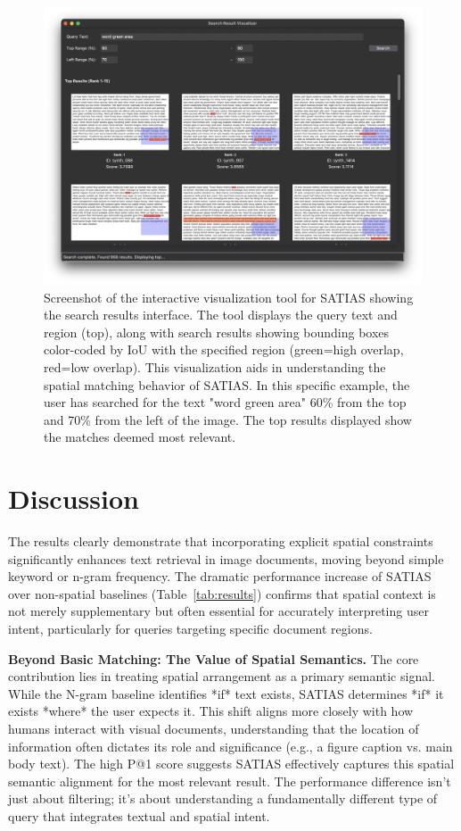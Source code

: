 \documentclass[manuscript,screen]{acmart}
\begin{document}
\begin{figure}
    \centering
    \includegraphics[width=\linewidth]{visualization_tool.png}
    \caption{Screenshot of the interactive visualization tool for SATIAS showing the search results interface. The tool displays the query text and region (top), along with search results showing bounding boxes color-coded by IoU with the specified region (green=high overlap, red=low overlap). This visualization aids in understanding the spatial matching behavior of SATIAS. In this specific example, the user has searched for the text "word green area" 60\% from the top and 70\% from the left of the image. The top results displayed show the matches deemed most relevant.}
    \label{fig:visualization-tool}
\end{figure}

\section{Discussion}
\label{sec:discussion}

The results clearly demonstrate that incorporating explicit spatial constraints significantly enhances text retrieval in image documents, moving beyond simple keyword or n-gram frequency. The dramatic performance increase of SATIAS over non-spatial baselines (Table~\ref{tab:results}) confirms that spatial context is not merely supplementary but often essential for accurately interpreting user intent, particularly for queries targeting specific document regions.

\textbf{Beyond Basic Matching: The Value of Spatial Semantics.} The core contribution lies in treating spatial arrangement as a primary semantic signal. While the N-gram baseline identifies *if* text exists, SATIAS determines *if* it exists *where* the user expects it. This shift aligns more closely with how humans interact with visual documents, understanding that the location of information often dictates its role and significance (e.g., a figure caption vs. main body text). The high P@1 score suggests SATIAS effectively captures this spatial semantic alignment for the most relevant result. The performance difference isn't just about filtering; it's about understanding a fundamentally different type of query that integrates textual and spatial intent.
\end{document}
